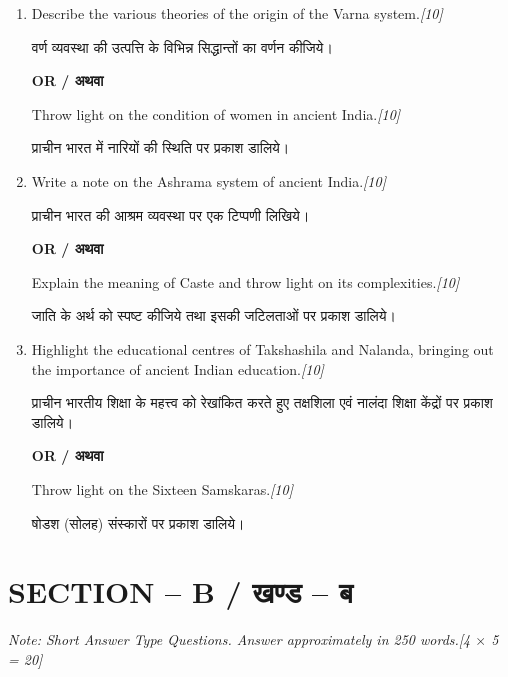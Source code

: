 \documentclass[11pt,a4paper]{article}
\newcommand{\pts}[1]{\hfill \textit{[#1]}}
\begin{document}
\begin{enumerate}[label=\textbf{\arabic*.},leftmargin=*,itemsep=12pt]

  \item Describe the various theories of the origin of the Varna system.\pts{10}
  
  वर्ण व्यवस्था की उत्पत्ति के विभिन्न सिद्धान्तों का वर्णन कीजिये।

  \begin{center}\textbf{OR / अथवा}\end{center}

  Throw light on the condition of women in ancient India.\pts{10}
  
  प्राचीन भारत में नारियों की स्थिति पर प्रकाश डालिये।

  \item Write a note on the Ashrama system of ancient India.\pts{10}
  
  प्राचीन भारत की आश्रम व्यवस्था पर एक टिप्पणी लिखिये।

  \begin{center}\textbf{OR / अथवा}\end{center}

  Explain the meaning of Caste and throw light on its complexities.\pts{10}
  
  जाति के अर्थ को स्पष्ट कीजिये तथा इसकी जटिलताओं पर प्रकाश डालिये।

  \item Highlight the educational centres of Takshashila and Nalanda, bringing out the importance of ancient Indian education.\pts{10}
  
  प्राचीन भारतीय शिक्षा के महत्त्व को रेखांकित करते हुए तक्षशिला एवं नालंदा शिक्षा केंद्रों पर प्रकाश डालिये।

  \begin{center}\textbf{OR / अथवा}\end{center}

  Throw light on the Sixteen Samskaras.\pts{10}
  
  षोडश (सोलह) संस्कारों पर प्रकाश डालिये।

\end{enumerate}

\bigskip

\section*{SECTION -- B / खण्ड -- ब}
\noindent \textit{Note: Short Answer Type Questions. Answer approximately in 250 words.}\pts{4 $\times$ 5 = 20}
\end{document}
